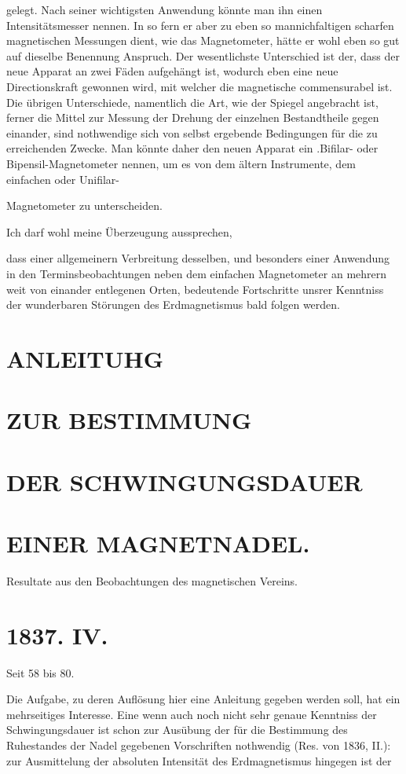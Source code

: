 \documentclass[12pt,a4paper]{article}
\begin{document}
gelegt. Nach seiner wichtigsten Anwendung könnte man ihn einen Intensitätsmesser nennen. In so fern er aber zu eben so mannichfaltigen scharfen magnetischen Messungen dient, wie das Magnetometer, hätte er wohl eben so gut auf dieselbe Benennung Anspruch. Der wesentlichste Unterschied ist der, dass der neue Apparat an zwei Fäden aufgehängt ist, wodurch eben eine neue Directionskraft gewonnen wird, mit welcher die magnetische commensurabel ist. Die übrigen Unterschiede, namentlich die Art, wie der Spiegel angebracht ist, ferner die Mittel zur Messung der Drehung der einzelnen Bestandtheile gegen einander, sind nothwendige sich von selbst ergebende Bedingungen für die zu erreichenden Zwecke. Man könnte daher den neuen Apparat ein .Bifilar- oder Bipensil-Magnetometer nennen, um es von dem ältern Instrumente, dem einfachen oder Unifilar-

Magnetometer zu unterscheiden.

Ich darf wohl meine Überzeugung aussprechen,

dass einer allgemeinern Verbreitung desselben, und besonders einer Anwendung in den Terminsbeobachtungen neben dem einfachen Magnetometer an mehrern weit von einander entlegenen Orten, bedeutende Fortschritte unsrer Kenntniss der wunderbaren Störungen des Erdmagnetismus bald folgen werden.

\section*{ANLEITUHG}
\section*{ZUR BESTIMMUNG}
\section*{DER SCHWINGUNGSDAUER}
\section*{EINER MAGNETNADEL.}
Resultate aus den Beobachtungen des magnetischen Vereins.

\section*{1837. IV.}
Seit 58 bis 80.

Die Aufgabe, zu deren Auflösung hier eine Anleitung gegeben werden soll, hat ein mehrseitiges Interesse. Eine wenn auch noch nicht sehr genaue Kenntniss der Schwingungsdauer ist schon zur Ausübung der für die Bestimmung des Ruhestandes der Nadel gegebenen Vorschriften nothwendig (Res. von 1836, II.): zur Ausmittelung der absoluten Intensität des Erdmagnetismus hingegen ist der
\end{document}
